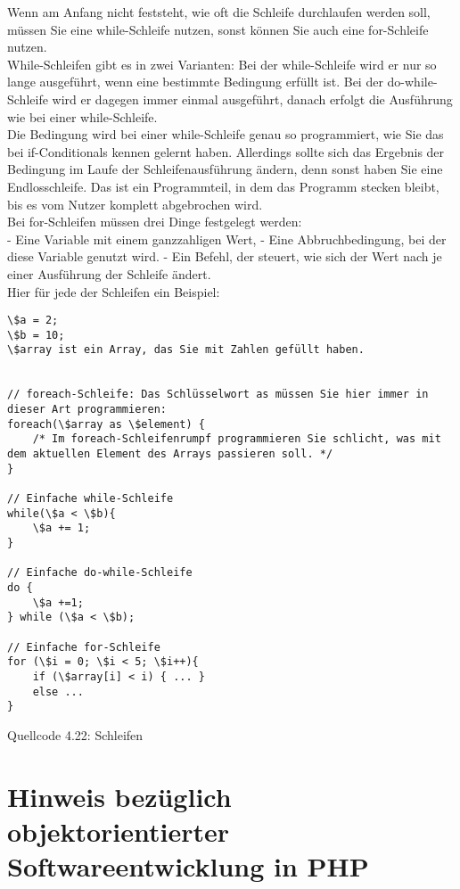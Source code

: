 Wenn am Anfang nicht feststeht, wie oft die Schleife durchlaufen werden soll, müssen Sie eine while-Schleife nutzen, sonst können Sie auch eine for-Schleife nutzen.\\

While-Schleifen gibt es in zwei Varianten: Bei der while-Schleife wird er nur so lange ausgeführt, wenn eine bestimmte Bedingung erfüllt ist. Bei der do-while-Schleife wird er dagegen immer einmal ausgeführt, danach erfolgt die Ausführung wie bei einer while-Schleife.\\

Die Bedingung wird bei einer while-Schleife genau so programmiert, wie Sie das bei if-Conditionals kennen gelernt haben. Allerdings sollte sich das Ergebnis der Bedingung im Laufe der Schleifenausführung ändern, denn sonst haben Sie eine Endlosschleife. Das ist ein Programmteil, in dem das Programm stecken bleibt, bis es vom Nutzer komplett abgebrochen wird.\\

Bei for-Schleifen müssen drei Dinge festgelegt werden: \\

-	Eine Variable mit einem ganzzahligen Wert, 
-	Eine Abbruchbedingung, bei der diese Variable genutzt wird.
-	Ein Befehl, der steuert, wie sich der Wert nach je einer Ausführung der Schleife ändert.\\

Hier für jede der Schleifen ein Beispiel:\\

\begin{verbatim}
\$a = 2;
\$b = 10;
\$array ist ein Array, das Sie mit Zahlen gefüllt haben.


// foreach-Schleife: Das Schlüsselwort as müssen Sie hier immer in dieser Art programmieren:
foreach(\$array as \$element) {
	/* Im foreach-Schleifenrumpf programmieren Sie schlicht, was mit dem aktuellen Element des Arrays passieren soll. */
}

// Einfache while-Schleife
while(\$a < \$b){
	\$a += 1;
}

// Einfache do-while-Schleife
do {
	\$a +=1;
} while (\$a < \$b);

// Einfache for-Schleife
for (\$i = 0; \$i < 5; \$i++){
	if (\$array[i] < i) { ... }
	else ...
}
\end{verbatim}
Quellcode 4.22: Schleifen

\section{Hinweis bezüglich objektorientierter Softwareentwicklung in PHP}

